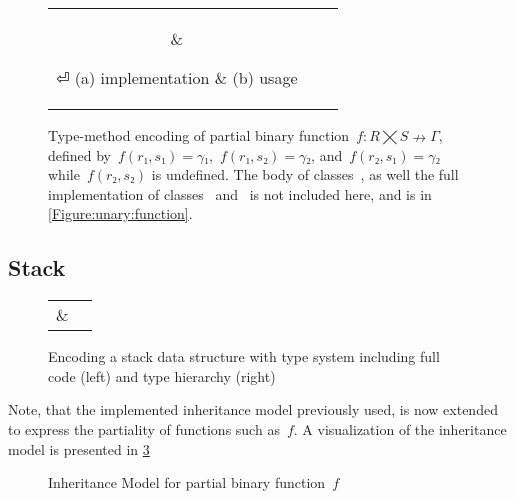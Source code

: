 \begin{figure}[hbt]
  \begin{tabular}{cc}
   \parbox[c]{0.42\linewidth}{
   }
   &
   \parbox[c]{0.58\linewidth}{
   }
⏎
   \hspace{-7ex}(a) implementation & \hspace{-7ex}(b) usage
  \caption{Type-method encoding of partial binary function~$f: R⨉S↛Γ$,
  defined by~$f(r₁,s₁)=γ₁$,~$f(r₁,s₂)=γ₂$, and~$f(r₂,s₁)=γ₂$ while~$f(r₂, s₂)$ is undefined.
  The body of classes~, as well the full implementation of classes~ and~ is not included here, and is
    in \cref{Figure:unary:function}.}
  \end{tabular}
  \label{Figure:simple:binary}
\end{figure}

\subsection{Stack}
\begin{figure}[h]
    \caption{Encoding a stack data structure with
    \Java type system including full code (left) and type hierarchy (right)}\label{Figure:stack:encoding}
    \begin{tabular}{cc}
         \parbox[c]{0.74\linewidth}{
      }
        &
         \parbox[c]{\hsize}{
          
        }
    \end{tabular}
\end{figure}
      Note, that the implemented inheritance model previously used, is now extended to express the partiality
        of functions such as~$f$. A visualization of the inheritance model is presented in \cref{Figure:partial:inheritance:model}

\begin{figure}[ht]
  \label{Figure:partial:inheritance:model}
  \caption{Inheritance Model for partial binary function~$f$}
  \begin{adjustbox}{max width=0.6\linewidth}
    
  \end{adjustbox}
\end{figure}

